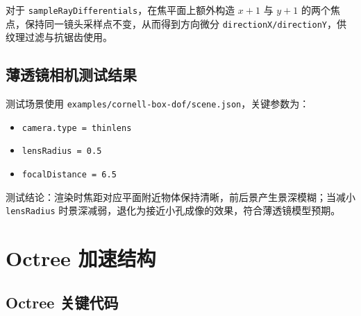 \documentclass{article}
\begin{document}
对于 \texttt{sampleRayDifferentials}，在焦平面上额外构造 $x+1$ 与 $y+1$ 的两个焦点，保持同一镜头采样点不变，从而得到方向微分 \texttt{directionX/directionY}，供纹理过滤与抗锯齿使用。

\subsection{薄透镜相机测试结果}

测试场景使用 \texttt{examples/cornell-box-dof/scene.json}，关键参数为：
\begin{itemize}
    \item \texttt{camera.type = thinlens}
    \item \texttt{lensRadius = 0.5}
    \item \texttt{focalDistance = 6.5}
\end{itemize}

测试结论：渲染时焦距对应平面附近物体保持清晰，前后景产生景深模糊；当减小 \texttt{lensRadius} 时景深减弱，退化为接近小孔成像的效果，符合薄透镜模型预期。

\section{Octree 加速结构}

\subsection{Octree 关键代码}
\end{document}
